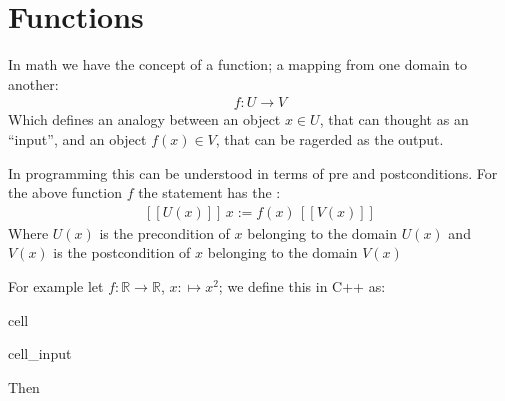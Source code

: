 \documentclass[a4paper,10pt,english]{jupyterBook}
\begin{document}
\sphinxstepscope


\chapter{Functions}
\label{\detokenize{text/progtut/functions:functions}}\label{\detokenize{text/progtut/functions::doc}}
\sphinxAtStartPar
In math we have the concept of a function; a mapping from one domain to another:
\begin{equation*}
\begin{split}
f:U \rightarrow V
\end{split}
\end{equation*}
\sphinxAtStartPar
Which defines an analogy between an object \(x\in U\), that can thought as an “input”, and an object \(f(x) \in V\), that can be ragerded as the output.

\begin{sphinxShadowBox}
\sphinxstylesidebartitle{}

\sphinxAtStartPar
{}
\end{sphinxShadowBox}

\sphinxAtStartPar
In programming this can be understood in terms of pre\sphinxhyphen{} and post\sphinxhyphen{}conditions.
For the above function \(f\) the statement  has the :
\begin{equation*}
\begin{split}
[\![U(x)]\!] \, x := f(x) \, [\![V(x)]\!]
\end{split}
\end{equation*}
\sphinxAtStartPar
Where \(U(x)\) is the pre\sphinxhyphen{}condition of \(x\) belonging to the domain \(U(x)\) and \(V(x)\) is the post\sphinxhyphen{}condition of \(x\) belonging to the domain \(V(x)\)

\sphinxAtStartPar
For example let \(f:\mathbb{R}\rightarrow\mathbb{R}\), \(x:\mapsto x^2\); we define this in C++
as:

\begin{sphinxuseclass}{cell}\begin{sphinxVerbatimInput}

\begin{sphinxuseclass}{cell_input}
\begin{sphinxVerbatim}[commandchars=\\\{\}]
\end{sphinxVerbatim}

\end{sphinxuseclass}\end{sphinxVerbatimInput}

\end{sphinxuseclass}
\sphinxAtStartPar
Then
\end{document}
